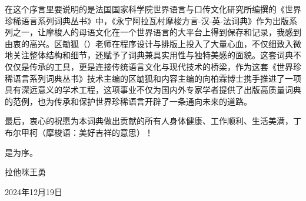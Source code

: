 在这个序言里要说明的是法国国家科学院世界语言与口传文化研究所编撰的《世界珍稀语言系列词典丛书》中，《永宁阿拉瓦村摩梭方言-汉-英-法词典》作为出版系列之一，让摩梭人的母语文化在一个世界语言的大平台上得到保存和记录，我感到由衷的高兴。区勄狐（）老师在程序设计与排版上投入了大量心血，不仅细致入微地关注整体结构和细节，还赋予了词典兼具实用性与独特美感的面貌。这套词典不仅仅是传承的工具，更是连接传统语言文化与现代技术的桥梁，作为这套《世界珍稀语言系列词典丛书》技术主编的区勄狐和内容主编的向柏霖博士携手推进了一项具有深远意义的学术工程，这项事业不仅为国内外专家学者提供了出版高质量词典的范例，也为传承和保护世界珍稀语言开辟了一条通向未来的道路。


最后，衷心的祝愿为本词典做出贡献的所有人身体健康、工作顺利、生活美满，丁布尔甲柯（摩梭语：美好吉祥的意思）！

是为序。

{\raggedleft 拉他咪王勇\par}

{\raggedleft 2024年12月19日\par}
